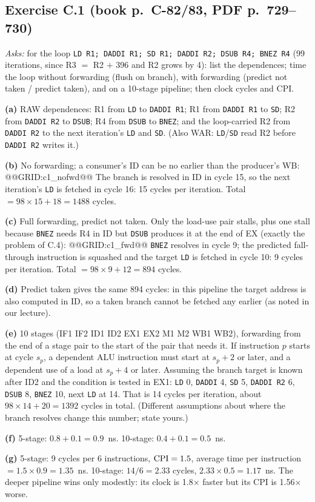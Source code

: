 \documentclass[11pt]{article}
\newcommand{\ex}[3]{\subsection*{Exercise #1 \normalfont\small(book p.~#2, PDF p.~#3)}%
  \addcontentsline{toc}{subsection}{Exercise #1}}
\begin{document}
\ex{C.1}{C-82/83}{729--730}
\emph{Asks:} for the loop \texttt{LD R1; DADDI R1; SD R1; DADDI R2; DSUB R4;
BNEZ R4} (99 iterations, since R3 $=$ R2 $+$ 396 and R2 grows by 4): list
the dependences; time the loop without forwarding (flush on branch), with
forwarding (predict not taken / predict taken), and on a 10-stage pipeline;
then clock cycles and CPI.
\begin{solution}
\textbf{(a)} RAW dependences: R1 from \texttt{LD} to \texttt{DADDI R1};
R1 from \texttt{DADDI R1} to \texttt{SD}; R2 from \texttt{DADDI R2} to
\texttt{DSUB}; R4 from \texttt{DSUB} to \texttt{BNEZ}; and the loop-carried
R2 from \texttt{DADDI R2} to the next iteration's \texttt{LD} and
\texttt{SD}. (Also WAR: \texttt{LD}/\texttt{SD} read R2 before
\texttt{DADDI R2} writes it.)

\textbf{(b)} No forwarding; a consumer's ID can be no earlier than the
producer's WB:
@@GRID:c1_nofwd@@
The branch is resolved in ID in cycle 15, so the next iteration's
\texttt{LD} is fetched in cycle 16: 15 cycles per iteration. Total $=
98\times15 + 18 = 1488$ cycles.

\textbf{(c)} Full forwarding, predict not taken. Only the load-use pair
stalls, plus one stall because \texttt{BNEZ} needs R4 in ID but
\texttt{DSUB} produces it at the end of EX (exactly the problem of C.4):
@@GRID:c1_fwd@@
\texttt{BNEZ} resolves in cycle 9; the predicted fall-through instruction is
squashed and the target \texttt{LD} is fetched in cycle 10: 9 cycles per
iteration. Total $= 98\times9 + 12 = 894$ cycles.

\textbf{(d)} Predict taken gives the same 894 cycles: in this pipeline the
target address is also computed in ID, so a taken branch cannot be
fetched any earlier (as noted in our lecture).

\textbf{(e)} 10 stages (IF1 IF2 ID1 ID2 EX1 EX2 M1 M2 WB1 WB2), forwarding
from the end of a stage pair to the start of the pair that needs it. If
instruction $p$ starts at cycle $s_p$, a dependent ALU instruction must start
at $s_p+2$ or later, and a dependent use of a load at $s_p+4$ or later.
Assuming the branch target is known after ID2 and the condition is tested in
EX1: \texttt{LD} 0, \texttt{DADDI} 4, \texttt{SD} 5, \texttt{DADDI R2} 6,
\texttt{DSUB} 8, \texttt{BNEZ} 10, next \texttt{LD} at 14. That is 14 cycles
per iteration, about $98\times14 + 20 = 1392$ cycles in total. (Different
assumptions about where the branch resolves change this number; state
yours.)

\textbf{(f)} 5-stage: $0.8 + 0.1 = 0.9$~ns. 10-stage: $0.4 + 0.1 =
0.5$~ns.

\textbf{(g)} 5-stage: 9 cycles per 6 instructions, $\mathrm{CPI} = 1.5$, average
time per instruction $=1.5\times0.9 = 1.35$~ns. 10-stage: $14/6 = 2.33$
cycles, $2.33\times0.5 = 1.17$~ns. The deeper pipeline wins only modestly:
its clock is 1.8$\times$ faster but its CPI is 1.56$\times$ worse.
\end{solution}
\end{document}
